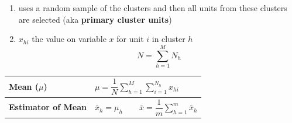 \begin{enumerate}
    \item uses a random sample of the clusters and then all units from these clusters are selected (aka \textbf{primary cluster units})

    \item $x_{hi}$ the value on variable $x$ for unit $i$ in cluster $h$
    \[
        N = \displaystyle\sum_{h=1}^{M} N_h
    \]

    
\end{enumerate}

\begin{longtable}{|p{5cm}|p{9cm}|}
    \hline\endfirsthead
    \hline\endhead
    \hline\endfoot
    \hline\endlastfoot

    \textbf{Mean ($\mu$)} & $
        \mu = \dfrac{1}{N}
        \displaystyle\sum_{h=1}^{M}
        \displaystyle\sum_{i=1}^{N_h}
        x_{hi}
    $\\[1ex]
    \hline

    \textbf{Estimator of Mean} & $
        \bar{x}_h = \mu_h
        \quad\quad
        \bar{x} = \dfrac{1}{m}
        \displaystyle\sum_{h=1}^{m} \bar{x}_h
    $\\[1ex]
    \hline

    
\end{longtable}



























